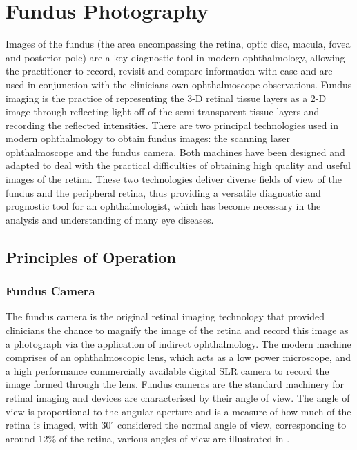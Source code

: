 
\chapter{Fundus Photography}
\label{fundus_photography}


Images of the fundus (the area encompassing the
retina, optic disc, macula, fovea and posterior pole) are a key
diagnostic tool in modern ophthalmology, allowing the practitioner
to record, revisit and compare information with ease and are used
in conjunction with the clinicians own ophthalmoscope observations.
Fundus imaging is the practice of representing the 3-D retinal
tissue layers as a 2-D image through reflecting light off of
the semi-transparent tissue layers and recording the reflected
intensities. 
There are two principal technologies used in modern ophthalmology
to obtain fundus images: the scanning \Gls{laser} ophthalmoscope
and the fundus camera. Both machines have been designed and
adapted to deal with the practical difficulties of obtaining high quality
and useful images of the retina. These two technologies deliver
diverse fields of view of the fundus and the peripheral retina, thus
providing a versatile diagnostic and prognostic tool for an ophthalmologist,
which has become necessary in the analysis and understanding of
many eye diseases.\cite{spaide2005medical}


\section{Principles of Operation}

\subsection{Fundus Camera}

The fundus camera is the original retinal imaging technology that
provided clinicians the chance to magnify the image of the retina
and record this image as a photograph via the application of indirect
ophthalmology. The modern machine comprises of an ophthalmoscopic lens,
which acts as a low power microscope, and a high performance commercially
available digital SLR camera to record the image formed through the
lens.\cite{shibata2003fundus} Fundus cameras are the standard machinery
for retinal imaging and devices are characterised by their angle of
view. The angle of view is proportional to the angular aperture and is a
measure of how much of the retina is imaged, with 30$^\circ$ considered
the normal angle of view, corresponding to around 12\% of the retina,
various angles of view are illustrated in .

